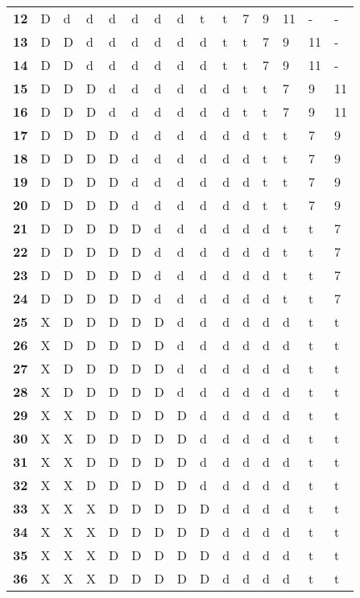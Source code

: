 \begin{multicols*}{2}
\begin {table}[H]
\begin{tabularx}{\columnwidth}{>{\bfseries}M{.2in}YYYYYYYYYYYYYY}
		12 & D & d & d & d & d & d & d & t & t & 7 & 9 & 11 & - & -\\
		13 & D & D & d & d & d & d & d & d & t & t & 7 & 9 & 11 & -\\
		14 & D & D & d & d & d & d & d & d & t & t & 7 & 9 & 11 & -\\
		15 & D & D & D & d & d & d & d & d & d & t & t & 7 & 9 & 11\\
		16 & D & D & D & d & d & d & d & d & d & t & t & 7 & 9 & 11\\
		17 & D & D & D & D & d & d & d & d & d & d & t & t & 7 & 9\\
		18 & D & D & D & D & d & d & d & d & d & d & t & t & 7 & 9\\
		19 & D & D & D & D & d & d & d & d & d & d & t & t & 7 & 9\\
		20 & D & D & D & D & d & d & d & d & d & d & t & t & 7 & 9\\
		21 & D & D & D & D & D & d & d & d & d & d & d & t & t & 7\\
		22 & D & D & D & D & D & d & d & d & d & d & d & t & t & 7\\
		23 & D & D & D & D & D & d & d & d & d & d & d & t & t & 7\\
		24 & D & D & D & D & D & d & d & d & d & d & d & t & t & 7\\
		25 & X & D & D & D & D & D & d & d & d & d & d & d & t & t\\
		26 & X & D & D & D & D & D & d & d & d & d & d & d & t & t\\
		27 & X & D & D & D & D & D & d & d & d & d & d & d & t & t\\
		28 & X & D & D & D & D & D & d & d & d & d & d & d & t & t\\
		29 & X & X & D & D & D & D & D & d & d & d & d & d & t & t\\
		30 & X & X & D & D & D & D & D & d & d & d & d & d & t & t\\
		31 & X & X & D & D & D & D & D & d & d & d & d & d & t & t\\
		32 & X & X & D & D & D & D & D & d & d & d & d & d & t & t\\
		33 & X & X & X & D & D & D & D & D & d & d & d & d & t & t\\
		34 & X & X & X & D & D & D & D & D & d & d & d & d & t & t\\
		35 & X & X & X & D & D & D & D & D & d & d & d & d & t & t\\
		36 & X & X & X & D & D & D & D & D & d & d & d & d & t & t\
  \end {tabularx}
\end {table}


\end{multicols*}
